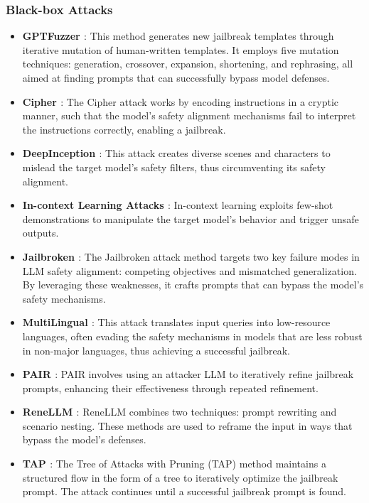 \subsubsection{Black-box Attacks}

\begin{itemize}
    \item \textbf{GPTFuzzer \cite{yu2023gptfuzzer}}: This method generates new jailbreak templates through iterative mutation of human-written templates. It employs five mutation techniques: generation, crossover, expansion, shortening, and rephrasing, all aimed at finding prompts that can successfully bypass model defenses.
    \item \textbf{Cipher \cite{yuan2023toosmart}}: The Cipher attack works by encoding instructions in a cryptic manner, such that the model's safety alignment mechanisms fail to interpret the instructions correctly, enabling a jailbreak.
    \item \textbf{DeepInception \cite{li2023deepinception}}: This attack creates diverse scenes and characters to mislead the target model’s safety filters, thus circumventing its safety alignment.
    \item \textbf{In-context Learning Attacks \cite{ICD}}: In-context learning exploits few-shot demonstrations to manipulate the target model's behavior and trigger unsafe outputs.
    \item \textbf{Jailbroken \cite{DBLP:journals/corr/abs-2307-02483}}: The Jailbroken attack method targets two key failure modes in LLM safety alignment: competing objectives and mismatched generalization. By leveraging these weaknesses, it crafts prompts that can bypass the model’s safety mechanisms.
    \item \textbf{MultiLingual \cite{deng2023multilingual}}: This attack translates input queries into low-resource languages, often evading the safety mechanisms in models that are less robust in non-major languages, thus achieving a successful jailbreak.
    \item \textbf{PAIR \cite{chao2023jailbreaking}}: PAIR involves using an attacker LLM to iteratively refine jailbreak prompts, enhancing their effectiveness through repeated refinement.
    \item \textbf{ReneLLM \cite{ding2023wolf}}: ReneLLM combines two techniques: prompt rewriting and scenario nesting. These methods are used to reframe the input in ways that bypass the model’s defenses.
    \item \textbf{TAP \cite{mehrotra2023tree}}: The Tree of Attacks with Pruning (TAP) method maintains a structured flow in the form of a tree to iteratively optimize the jailbreak prompt. The attack continues until a successful jailbreak prompt is found.
\end{itemize}


